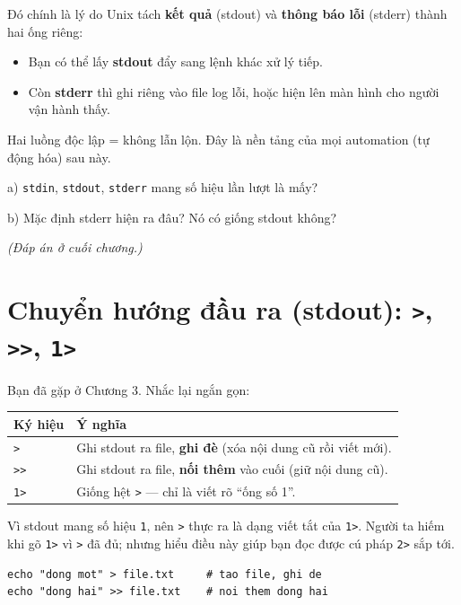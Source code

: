 \documentclass[12pt,a4paper]{article}
\newcommand{\cmd}[1]{\texttt{#1}}
\begin{document}
Đó chính là lý do Unix tách \textbf{kết quả} (stdout) và \textbf{thông báo lỗi} (stderr) thành hai ống riêng:

\begin{itemize}[leftmargin=1.4em]
\item Bạn có thể lấy \textbf{stdout} đẩy sang lệnh khác xử lý tiếp.
\item Còn \textbf{stderr} thì ghi riêng vào file log lỗi, hoặc hiện lên màn hình cho người vận hành thấy.
\end{itemize}

Hai luồng độc lập = không lẫn lộn. Đây là nền tảng của mọi automation (tự động hóa) sau này.

\begin{checkbox}[title={Tự kiểm tra 2}]
a) \cmd{stdin}, \cmd{stdout}, \cmd{stderr} mang số hiệu lần lượt là mấy?

b) Mặc định stderr hiện ra đâu? Nó có giống stdout không?

\textit{(Đáp án ở cuối chương.)}
\end{checkbox}

\section{Chuyển hướng đầu ra (stdout): \texttt{>}, \texttt{>>}, \texttt{1>}}

Bạn đã gặp ở Chương 3. Nhắc lại ngắn gọn:

\begin{center}
\begin{tabular}{>{\raggedright\arraybackslash}p{2.2cm} >{\raggedright\arraybackslash}p{10cm}}
\rowcolor{seniorbluebg}
\textbf{Ký hiệu} & \textbf{Ý nghĩa} \\
\hline
\cmd{>} & Ghi stdout ra file, \textbf{ghi đè} (xóa nội dung cũ rồi viết mới). \\
\cmd{>>} & Ghi stdout ra file, \textbf{nối thêm} vào cuối (giữ nội dung cũ). \\
\cmd{1>} & Giống hệt \cmd{>} --- chỉ là viết rõ ``ống số 1''. \\
\end{tabular}
\end{center}

Vì stdout mang số hiệu \cmd{1}, nên \cmd{>} thực ra là dạng viết tắt của \cmd{1>}. Người ta hiếm khi gõ \cmd{1>} vì \cmd{>} đã đủ; nhưng hiểu điều này giúp bạn đọc được cú pháp \cmd{2>} sắp tới.

\begin{Verbatim}
echo "dong mot" > file.txt     # tao file, ghi de
echo "dong hai" >> file.txt    # noi them dong hai
\end{Verbatim}
\end{document}
